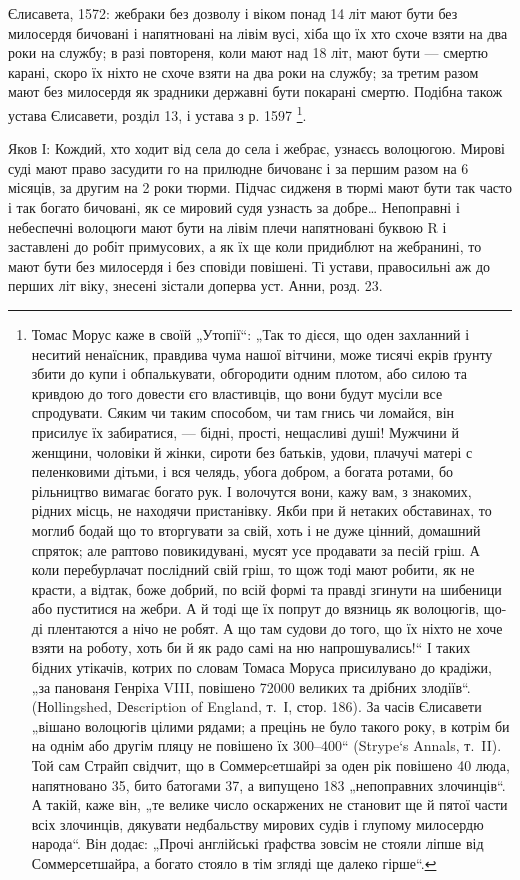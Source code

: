 Єлисавета, 1572: жебраки без дозволу і віком понад 14 літ мают бути без
милосердя бичовані і напятновані на лівім вусі, хіба що їх хто схоче взяти на
два роки на службу; в разі повтореня, коли мают над 18 літ, мают бути — смертю
карані, скоро їх ніхто не схоче взяти на два роки на службу; за третим разом
мают без милосердя як зрадники державні бути покарані смертю. Подібна також 
устава Єлисавети, розділ 13, і устава з р. 1597 \footnote{
Томас Морус каже в своїй „Утопії“: „Так то дієся, що оден захланний і неситий
ненаїсник, правдива чума нашої вітчини, може тисячі екрів ґрунту збити до купи
і обпалькувати, обгородити одним плотом, або силою та кривдою до того довести
єго властивців, що вони будут мусіли все спродувати. Сяким чи таким способом,
чи там гнись чи ломайся, він присилує їх забиратися, — бідні, прості, нещасливі
душі! Мужчини й женщини, чоловіки й жінки, сироти без батьків, удови, плачучі
матері с пеленковими дітьми, і вся челядь, убога добром, а богата
ротами, бо рільництво вимагає богато рук. І волочутся вони, кажу вам,
з знакомих, рідних місць, не находячи пристанівку. Якби при й нетаких
обставинах, то моглиб бодай що то вторгувати за свій, хоть і не дуже
цінний, домашний спряток; але раптово повикидувані, мусят усе продавати
за песій гріш. А коли перебурлачат послідний свій гріш, то щож
тоді мают робити, як не красти, а відтак, боже добрий, по всій формі та
правді згинути на шибеници або пуститися на жебри. А й тоді ще їх
попрут до вязниць як волоцюгів, що-ді плентаются а нічо не робят.
А що там судови до того, що їх ніхто не хоче взяти на роботу, хоть би
й як радо самі на ню напрошувались!“ І таких бідних утікачів, котрих
по словам Томаса Моруса присилувано до крадіжи, „за панованя Генріха
VIII, повішено \num{72000} великих та дрібних злодіїв“. (Ноllingshed, Dеscription
of England, т.~І, стор. 186). За часів Єлисавети „вішано волоцюгів
цілими рядами; а прецінь не було такого року, в котрім би на
однім або другім пляцу не повішено їх 300--400“ (Strype`s Annals, т.~II).
Той сам Страйп свідчит, що в Соммерcетшайрі за оден рік повішено 40
люда, напятновано 35, бито батогами 37, а випущено 183 „непоправних
злочинців“. А такій, каже він, „те велике число оскаржених не становит
ще й пятої части всіх злочинців, дякувати недбальству мирових судів
і глупому милосердю народа“. Він додає: „Прочі англійські ґрафства
зовсім не стояли ліпше від Соммерсетшайра, а богато стояло в тім згляді
ще далеко гірше“.
}.

Яков І: Кождий, хто ходит від села до села і жебрає,
узнаєсь волоцюгою. Мирові суді мают право засудити го на
прилюдне бичованє і за першим разом на 6 місяців, за
другим на 2 роки тюрми. Підчас сидженя в тюрмі мают
бути так часто і так богато бичовані, як се мировий судя
узнасть за добре\dots{} Непоправні і небеспечні волоцюги мают
бути на лівім плечи напятновані буквою R і заставлені до
робіт примусових, а як їх ще коли придиблют на жебранині,
то мают бути без милосердя і без сповіди повішені. Ті устави,
правосильні аж до перших літ  віку,
знесені зістали доперва  уст. Анни, розд. 23.

